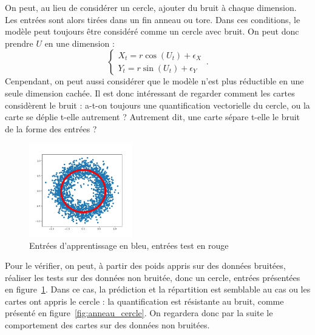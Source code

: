 On peut, au lieu de considérer un cercle, ajouter du bruit à chaque dimension. Les entrées sont alors tirées dans un fin anneau ou tore. Dans ces conditions, le modèle peut toujours être considéré comme un cercle avec bruit. On peut donc prendre $U$ en une dimension :  
$$
 \begin{cases}
     X_t = r  \cos(U_t) + \epsilon_X\\
     Y_t = r \sin(U_t) + \epsilon_Y
    \end{cases}\,.
$$
Cenpendant, on peut aussi considérer que le modèle n'est plus réductible en une seule dimension cachée.
Il est donc intéressant de regarder comment les cartes considèrent le bruit : a-t-on toujours une quantification vectorielle du cercle, ou la carte se déplie t-elle autrement ? Autrement dit, une carte sépare t-elle le bruit de la forme des entrées ?

\begin{figure}
\centering
\includegraphics[width=0.4\textwidth]{inputs_anneau_cercle.png}
\caption{Entrées d'apprentissage en bleu, entrées test en rouge}
\label{fig:inputs_anneau_cercle}
\end{figure}

Pour le vérifier, on peut, à partir des poids appris sur des données bruitées, réaliser les tests sur des données non bruitée, donc un cercle, entrées présentées en figure~\ref{fig:inputs_anneau_cercle}.
Dans ce cas, la prédiction et la répartition est semblable au cas ou les cartes ont appris le cercle : la quantification est résistante au bruit, comme présenté en figure~\ref{fig:anneau_cercle}. On regardera donc par la suite le comportement des cartes sur des données non bruitées. 

